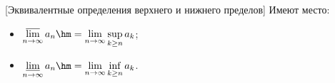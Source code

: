 [Эквивалентные определения верхнего и нижнего пределов] Имеют место:
	\begin{itemize}
 \item$\varlimsup\limits_{n\to\infty}a_n\hm=\lim\limits_{n\to\infty}\sup\limits_{k\geq n}a_k$;
 \item$\varliminf\limits_{n\to\infty}a_n\hm=\lim\limits_{n\to\infty}\inf\limits_{k\geq n}a_k$.
 \end{itemize}
 
